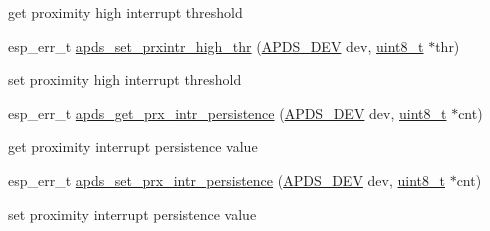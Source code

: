 \begin{DoxyCompactItemize}
\begin{DoxyCompactList}\small\item\em 
\begin{DoxyItemize}
\item get proximity high interrupt threshold 
\end{DoxyItemize}\end{DoxyCompactList}\item 
esp\+\_\+err\+\_\+t \hyperlink{group__APDS9960__ProximityFunctions_ga6157c022a79a16d29b22baebd03e6e49}{apds\+\_\+set\+\_\+prxintr\+\_\+high\+\_\+thr} (\hyperlink{structAPDS9960__Driver}{A\+P\+D\+S\+\_\+\+D\+EV} dev, \hyperlink{vl53l0x__types_8h_aba7bc1797add20fe3efdf37ced1182c5}{uint8\+\_\+t} $\ast$thr)
\begin{DoxyCompactList}\small\item\em 
\begin{DoxyItemize}
\item set proximity high interrupt threshold 
\end{DoxyItemize}\end{DoxyCompactList}\item 
esp\+\_\+err\+\_\+t \hyperlink{group__APDS9960__ProximityFunctions_ga4cb65518df4268820b5bec80fd0a1d6d}{apds\+\_\+get\+\_\+prx\+\_\+intr\+\_\+persistence} (\hyperlink{structAPDS9960__Driver}{A\+P\+D\+S\+\_\+\+D\+EV} dev, \hyperlink{vl53l0x__types_8h_aba7bc1797add20fe3efdf37ced1182c5}{uint8\+\_\+t} $\ast$cnt)
\begin{DoxyCompactList}\small\item\em 
\begin{DoxyItemize}
\item get proximity interrupt persistence value 
\end{DoxyItemize}\end{DoxyCompactList}\item 
esp\+\_\+err\+\_\+t \hyperlink{group__APDS9960__ProximityFunctions_gac96be9e41673bf8cccb3d3ccfa829b7b}{apds\+\_\+set\+\_\+prx\+\_\+intr\+\_\+persistence} (\hyperlink{structAPDS9960__Driver}{A\+P\+D\+S\+\_\+\+D\+EV} dev, \hyperlink{vl53l0x__types_8h_aba7bc1797add20fe3efdf37ced1182c5}{uint8\+\_\+t} $\ast$cnt)
\begin{DoxyCompactList}\small\item\em 
\begin{DoxyItemize}
\item set proximity interrupt persistence value 
\end{DoxyItemize}\end{DoxyCompactList}\item 

\end{DoxyCompactItemize}
